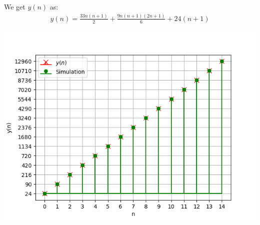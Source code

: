 \documentclass[journal,12pt,twocolumn]{IEEEtran}
\theoremstyle{remark}
\begin{document}
        We get $y(n)$ as: 
        \begin{align}
            y(n)=\frac{33n(n+1)}{2}+\frac{9n(n+1)(2 n+1)}{6}+24(n+1)
        \end{align}
        
        \includegraphics[width=\columnwidth]{plot.png}

        
            
           
             
             
             
        

        













\renewcommand{\thefigure}{\theenumi}
\renewcommand{\thetable}{\theenumi}
\end{document}
